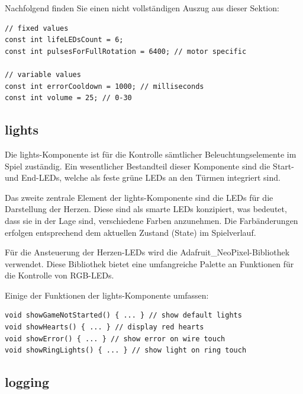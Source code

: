 Nachfolgend finden Sie einen nicht vollständigen Auszug aus dieser Sektion:

\begin{minipage}{\linewidth}
\begin{lstlisting}[caption={Spiel Konstanten},captionpos=b]
// fixed values
const int lifeLEDsCount = 6;
const int pulsesForFullRotation = 6400; // motor specific

// variable values
const int errorCooldown = 1000; // milliseconds
const int volume = 25; // 0-30
\end{lstlisting}
\end{minipage}

\subsection{lights}

Die lights-Komponente ist für die Kontrolle sämtlicher Beleuchtungselemente im Spiel zuständig. Ein wesentlicher Bestandteil dieser Komponente sind die Start- und End-LEDs, welche als feste grüne LEDs an den Türmen integriert sind.

Das zweite zentrale Element der lights-Komponente sind die LEDs für die Darstellung der Herzen. Diese sind als smarte LEDs konzipiert, was bedeutet, dass sie in der Lage sind, verschiedene Farben anzunehmen. Die Farbänderungen erfolgen entsprechend dem aktuellen Zustand (State) im Spielverlauf. 

Für die Ansteuerung der Herzen-LEDs wird die Adafruit\_NeoPixel-Bibliothek verwendet. Diese Bibliothek bietet eine umfangreiche Palette an Funktionen für die Kontrolle von RGB-LEDs.

Einige der Funktionen der lights-Komponente umfassen:

\begin{minipage}{\linewidth}
\begin{lstlisting}[caption={Wichtigste Beleuchtungsfunktionen},captionpos=b]
void showGameNotStarted() { ... } // show default lights
void showHearts() { ... } // display red hearts
void showError() { ... } // show error on wire touch
void showRingLights() { ... } // show light on ring touch
\end{lstlisting}
\end{minipage}    

\subsection{logging}

